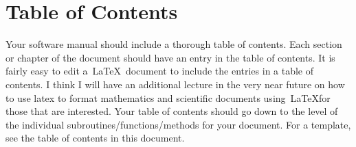 
\section{\bf Table of Contents}

Your software manual should include a thorough table of contents. Each section
or chapter of the document should have an entry in the table of contents. It is
fairly easy to edit a\ \LaTeX\ document to include the entries in a table of
contents. I think I will have an additional lecture in the very near future on
how to use latex to format mathematics and scientific documents using\ 
\LaTeX for those that are interested. Your table of contents should go down to
the level of the individual subroutines/functions/methods for your document.
For a template, see the table of contents in this document.

\newpage
